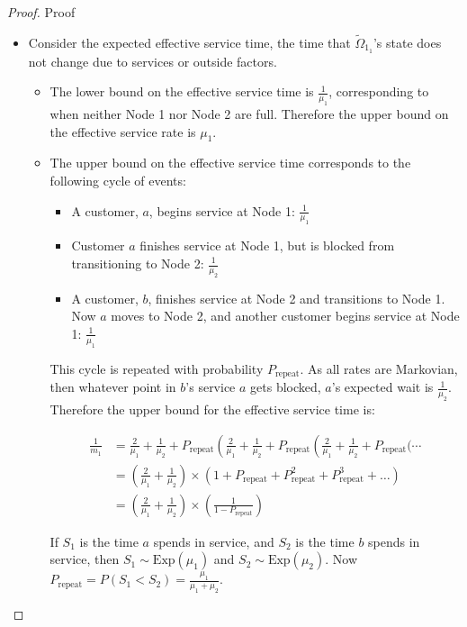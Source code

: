 \documentclass{article}
\numberwithin{equation}{section}
\begin{document}
\begin{proof}{Proof}
\begin{enumerate}
\begin{itemize}
\item Consider the expected effective service time, the time that
$\widetilde{\Omega}_{1_1}$'s state does not change due to services or outside
factors.

\begin{itemize}

\item The lower bound on the effective service time is $\frac{1}{\mu_1}$,
corresponding to when neither Node 1 nor Node 2 are full.
Therefore the upper bound on the effective service rate is $\mu_1$.

\item The upper bound on the effective service time corresponds to the
following cycle of events:

\begin{itemize}
  \item A customer, $a$, begins service at Node 1: $\frac{1}{\mu_1}$
  \item Customer $a$ finishes service at Node 1, but is blocked from
  transitioning to Node 2: $\frac{1}{\mu_2}$
  \item A customer, $b$, finishes service at Node 2 and transitions to Node 1.
  Now $a$ moves to Node 2, and another customer begins service at Node 1:
  $\frac{1}{\mu_1}$
\end{itemize}

This cycle is repeated with probability $P_{\text{repeat}}$.
As all rates are Markovian, then whatever point in $b$'s service $a$ gets
blocked, $a$'s expected wait is $\frac{1}{\mu_2}$.
Therefore the upper bound for the effective service time is:

\begin{align*}
  \frac{1}{m_1} &= \frac{2}{\mu_1} + \frac{1}{\mu_2} + P_{\text{repeat}} \left( \frac{2}{\mu_1} + \frac{1}{\mu_2} + P_{\text{repeat}} \left( \frac{2}{\mu_1} + \frac{1}{\mu_2} + P_{\text{repeat}} \bigg( \dotsi \right. \right. \\
  & = \left( \frac{2}{\mu_1} + \frac{1}{\mu_2} \right) \times \left( 1 + P_{\text{repeat}} + P_{\text{repeat}}^2 + P_{\text{repeat}}^3 + \dots \right) \\
  & = \left( \frac{2}{\mu_1} + \frac{1}{\mu_2} \right) \times \left( \frac{1}{1 - P_{\text{repeat}}} \right)
\end{align*}

If $S_1$ is the time $a$ spends in service, and $S_2$ is the time $b$ spends
in service, then $S_1 \sim \text{Exp}(\mu_1)$ and $S_2 \sim \text{Exp}(\mu_2)$.
Now $P_{\text{repeat}} = P(S_1 < S_2) = \frac{\mu_1}{\mu_1 + \mu_2}$.


\end{itemize}
\end{itemize}
\end{enumerate}
\end{proof}
\end{document}
